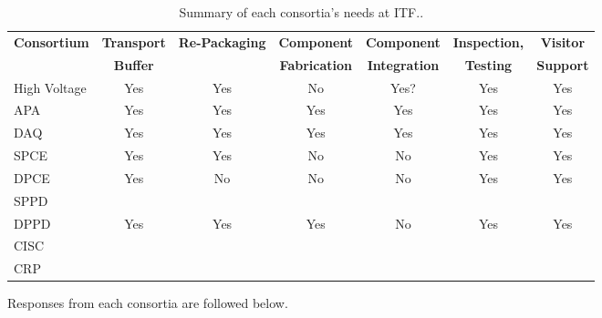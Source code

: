 \begin{table}[htbp]
\caption{Summary of each consortia's needs at ITF..}
\label{table:responses}
\begin{center}
\scalebox{0.95}
{
\begin{tabular}{|l|c|c|c|c|c|c| } 
\hline
{\bf Consortium} & {\bf Transport} &{\bf Re-Packaging}&{\bf Component}
&{\bf Component}&{\bf Inspection,}&{\bf Visitor} \\
 & {\bf Buffer} &{\bf }&{\bf Fabrication}
&{\bf Integration}&{\bf Testing}&{\bf Support} \\ \hline 
High Voltage & Yes & Yes & No & Yes? & Yes & Yes \\ \hline
APA & Yes & Yes & Yes & Yes & Yes & Yes \\ \hline
DAQ & Yes & Yes & Yes & Yes & Yes & Yes \\ \hline
SPCE & Yes & Yes & No & No & Yes & Yes \\ \hline
DPCE & Yes & No & No & No & Yes & Yes \\ \hline
SPPD & & & & & &  \\ \hline
DPPD & Yes & Yes & Yes & No & Yes & Yes \\ \hline
CISC & & & & & &  \\ \hline
CRP & & & & & &  \\   \hline
\end{tabular}
}
\end{center}
\end{table}

\noindent Responses from each consortia are followed below.

